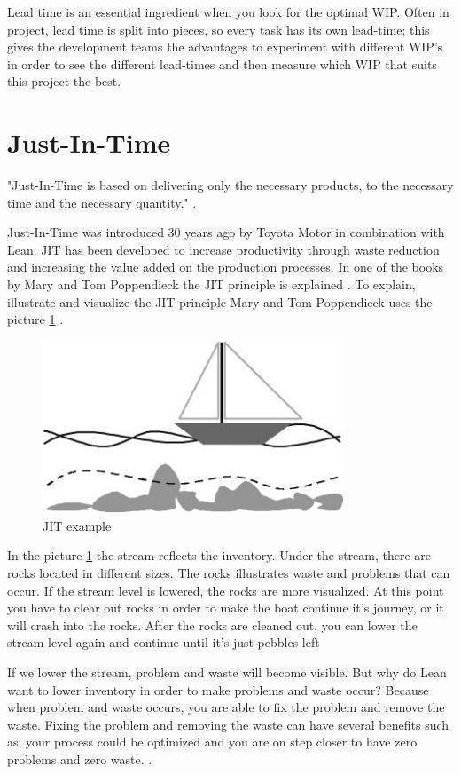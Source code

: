 \documentclass[UKenglish]{ifimaster}  %
\begin{document}
Lead time is an essential ingredient when you look for the optimal WIP. Often in project, lead time is split into pieces, so every task has its own lead-time; this gives the development teams the advantages to experiment with different WIP's in order to see the different lead-times and then measure which WIP that suits this project the best. 

\section{Just-In-Time}
"Just-In-Time is based on delivering only the necessary products, to the necessary time and the necessary quantity." \parencite{JIT}.

Just-In-Time was introduced 30 years ago by Toyota Motor in combination with Lean.  JIT has been developed to increase productivity through waste reduction and increasing the value added on the production processes. In one of the books by Mary and Tom Poppendieck the JIT principle is explained \parencite{Lean:2006}. To explain, illustrate and visualize the JIT principle Mary and Tom Poppendieck uses the picture \ref{JITE}  \parencite{JIT} \parencite{Lean:2006}.

\begin{figure}[ht!]
\centering
\includegraphics[width=90mm]{Picture/JIT.jpg}
\caption{JIT example}
\label{JITE} %
\end{figure}


In the picture \ref{JITE} the stream reflects the inventory.  Under the stream, there are rocks located in different sizes. The rocks illustrates waste and problems that can occur.  If the stream level is lowered, the rocks are more visualized. At this point you have to clear out rocks in order to make the boat continue it's journey, or it will crash into the rocks. After the rocks are cleaned out, you can lower the stream level again and continue until it's just pebbles left

If we lower the stream, problem and waste will become visible. But why do Lean want to lower inventory in order to make problems and waste occur? Because when problem and waste occurs, you are able to fix the problem and remove the waste. Fixing the problem and removing the waste can have several benefits such as, your process could be optimized and you are on step closer to have zero problems and zero waste.  \parencite{JIT} \parencite{Lean:2006}.
\end{document}
